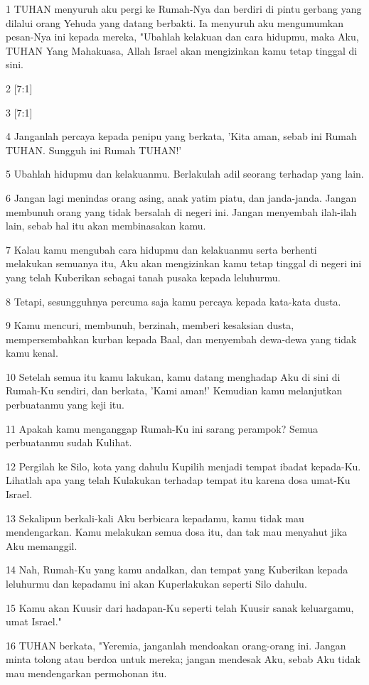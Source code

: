\par 1 TUHAN menyuruh aku pergi ke Rumah-Nya dan berdiri di pintu gerbang yang dilalui orang Yehuda yang datang berbakti. Ia menyuruh aku mengumumkan pesan-Nya ini kepada mereka, "Ubahlah kelakuan dan cara hidupmu, maka Aku, TUHAN Yang Mahakuasa, Allah Israel akan mengizinkan kamu tetap tinggal di sini.
\par 2 [7:1]
\par 3 [7:1]
\par 4 Janganlah percaya kepada penipu yang berkata, 'Kita aman, sebab ini Rumah TUHAN. Sungguh ini Rumah TUHAN!'
\par 5 Ubahlah hidupmu dan kelakuanmu. Berlakulah adil seorang terhadap yang lain.
\par 6 Jangan lagi menindas orang asing, anak yatim piatu, dan janda-janda. Jangan membunuh orang yang tidak bersalah di negeri ini. Jangan menyembah ilah-ilah lain, sebab hal itu akan membinasakan kamu.
\par 7 Kalau kamu mengubah cara hidupmu dan kelakuanmu serta berhenti melakukan semuanya itu, Aku akan mengizinkan kamu tetap tinggal di negeri ini yang telah Kuberikan sebagai tanah pusaka kepada leluhurmu.
\par 8 Tetapi, sesungguhnya percuma saja kamu percaya kepada kata-kata dusta.
\par 9 Kamu mencuri, membunuh, berzinah, memberi kesaksian dusta, mempersembahkan kurban kepada Baal, dan menyembah dewa-dewa yang tidak kamu kenal.
\par 10 Setelah semua itu kamu lakukan, kamu datang menghadap Aku di sini di Rumah-Ku sendiri, dan berkata, 'Kami aman!' Kemudian kamu melanjutkan perbuatanmu yang keji itu.
\par 11 Apakah kamu menganggap Rumah-Ku ini sarang perampok? Semua perbuatanmu sudah Kulihat.
\par 12 Pergilah ke Silo, kota yang dahulu Kupilih menjadi tempat ibadat kepada-Ku. Lihatlah apa yang telah Kulakukan terhadap tempat itu karena dosa umat-Ku Israel.
\par 13 Sekalipun berkali-kali Aku berbicara kepadamu, kamu tidak mau mendengarkan. Kamu melakukan semua dosa itu, dan tak mau menyahut jika Aku memanggil.
\par 14 Nah, Rumah-Ku yang kamu andalkan, dan tempat yang Kuberikan kepada leluhurmu dan kepadamu ini akan Kuperlakukan seperti Silo dahulu.
\par 15 Kamu akan Kuusir dari hadapan-Ku seperti telah Kuusir sanak keluargamu, umat Israel."
\par 16 TUHAN berkata, "Yeremia, janganlah mendoakan orang-orang ini. Jangan minta tolong atau berdoa untuk mereka; jangan mendesak Aku, sebab Aku tidak mau mendengarkan permohonan itu.
